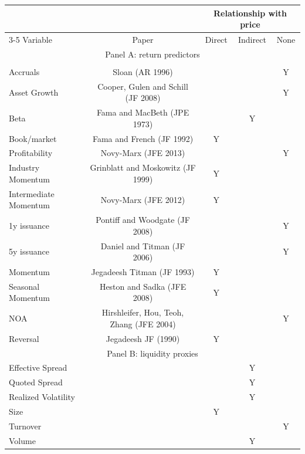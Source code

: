 \begin{tabular}{lcccc}
  \toprule & & \multicolumn{3}{c}{Relationship with price} \\
   \cmidrule(l){3-5}
Variable & Paper & Direct & Indirect & None \\ 
  \midrule \multicolumn{5}{c}{Panel A: return predictors} \\
 \midrule \\
Accruals & Sloan (AR 1996) &  &  & Y \\ 
  Asset Growth & Cooper, Gulen and Schill (JF 2008) &  &  & Y \\ 
  Beta & Fama and MacBeth (JPE 1973) &  & Y &  \\ 
  Book/market & Fama and French (JF 1992) & Y &  &  \\ 
  Profitability & Novy-Marx (JFE 2013) &  &  & Y \\ 
  Industry Momentum & Grinblatt and Moskowitz (JF 1999) & Y &  &  \\ 
  Intermediate Momentum & Novy-Marx (JFE 2012) & Y &  &  \\ 
  1y issuance & Pontiff and Woodgate (JF 2008) &  &  & Y \\ 
  5y issuance & Daniel and Titman (JF 2006) &  &  & Y \\ 
  Momentum & Jegadeesh Titman (JF 1993) & Y &  &  \\ 
  Seasonal Momentum & Heston and Sadka (JFE 2008) & Y &  &  \\ 
  NOA & Hirshleifer, Hou, Teoh, Zhang (JFE 2004) &  &  & Y \\ 
  Reversal & Jegadeesh JF (1990) & Y &  &  \\ 
   \midrule \multicolumn{5}{c}{Panel B: liquidity proxies} \\
   \midrule
Effective Spread &  &  & Y &  \\ 
  Quoted Spread &  &  & Y &  \\ 
  Realized Volatility &  &  & Y &  \\ 
  Size &  & Y &  &  \\ 
  Turnover &  &  &  & Y \\ 
  Volume &  &  & Y &  \\ 
   \bottomrule 
\end{tabular}
